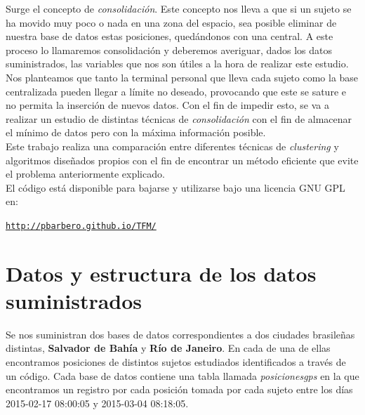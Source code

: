 \documentclass[a4paper, 12pt]{article}
\begin{document}
Surge el concepto de \textit{consolidaci\'on}. Este concepto nos lleva a que si un sujeto se ha movido muy poco o nada en una zona del espacio, sea posible eliminar de nuestra base de datos estas posiciones, qued\'andonos con una central. A este proceso lo llamaremos consolidaci\'on y deberemos averiguar, dados los datos suministrados, las variables que nos son \'utiles a la hora de realizar este estudio.\\

Nos planteamos que tanto la terminal personal que lleva cada sujeto como la base centralizada pueden llegar a l\'imite no deseado, provocando que este se sature e no permita la inserci\'on de nuevos datos. Con el fin de impedir esto, se va a realizar un estudio de distintas t\'ecnicas de \textit{consolidaci\'on} con el fin de almacenar el m\'inimo de datos pero con la m\'axima informaci\'on posible. \\

Este trabajo realiza una comparaci\'on entre diferentes t\'ecnicas de \textit{clustering} y algoritmos dise\~nados propios con el fin de encontrar un m\'etodo eficiente que evite el problema anteriormente explicado. \\

El c\'odigo est\'a disponible para bajarse y utilizarse bajo una licencia GNU GPL en:\\

\begin{center}\label{pbarbero}
	\href{http://pbarbero.github.io/TFM/}{\texttt{http://pbarbero.github.io/TFM/}}
\end{center}


\pagebreak

\section{Datos y estructura de los datos suministrados}

Se nos suministran dos bases de datos correspondientes a dos ciudades brasile\~nas distintas, \textbf{Salvador de Bah\'ia} y \textbf{R\'io de Janeiro}. En cada de una de ellas encontramos posiciones de distintos sujetos estudiados identificados a trav\'es de un c\'odigo. Cada base de datos contiene una tabla llamada \textit{posicionesgps} en la que encontramos un registro por cada posici\'on tomada por cada sujeto entre los d\'ias 2015-02-17 08:00:05 y 2015-03-04 08:18:05. \\
\end{document}
